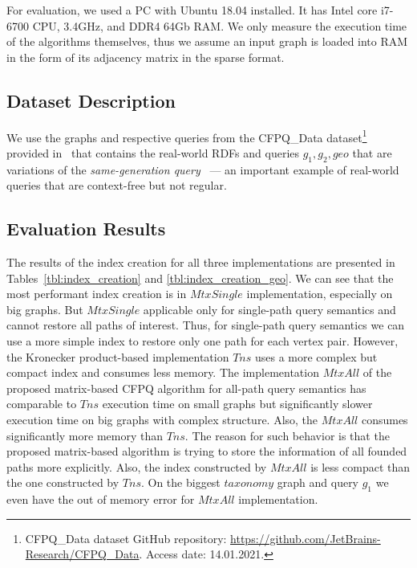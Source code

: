 For evaluation, we used a PC with Ubuntu 18.04 installed.
It has Intel core i7-6700 CPU, 3.4GHz, and DDR4 64Gb RAM.
We only measure the execution time of the algorithms themselves, thus we assume an input graph is loaded into RAM in the form of its adjacency matrix in the sparse format.

\subsection{Dataset Description}

We use the graphs and respective queries from the CFPQ\_Data dataset\footnote{CFPQ\_Data dataset GitHub repository: \url{https://github.com/JetBrains-Research/CFPQ_Data}. Access date: 14.01.2021.} provided in~\cite{10.1145/3398682.3399163} that contains the real-world RDFs and queries $g_1, g_2, geo$ 
that are variations of the \textit{same-generation query}~\cite{FndDB} --- an important example of real-world queries that are context-free but not regular.




\subsection{Evaluation Results}
The results of the index creation for all three implementations are presented in Tables~\ref{tbl:index_creation} and \ref{tbl:index_creation_geo}. We can see that the most performant index creation is in $MtxSingle$ implementation, especially on big graphs. But $MtxSingle$ applicable only for single-path query semantics  and cannot restore all paths of interest. Thus, for single-path query semantics we can use a more simple index to restore only one path for each vertex pair. However, the Kronecker product-based implementation $Tns$ uses a more complex but compact index and consumes less memory. The implementation $MtxAll$ of the proposed matrix-based CFPQ algorithm for all-path query semantics has comparable to $Tns$ execution time on small graphs but significantly slower execution time on big graphs with complex structure. Also, the $MtxAll$ 
consumes significantly more memory than $Tns$. The reason for such behavior is that the proposed matrix-based algorithm is trying to store the information of all founded paths more explicitly. Also, the index constructed by $MtxAll$ is less compact than the one constructed by $Tns$. On the biggest $taxonomy$ graph and query $g_1$ we even have the out of memory error for $MtxAll$ implementation.

